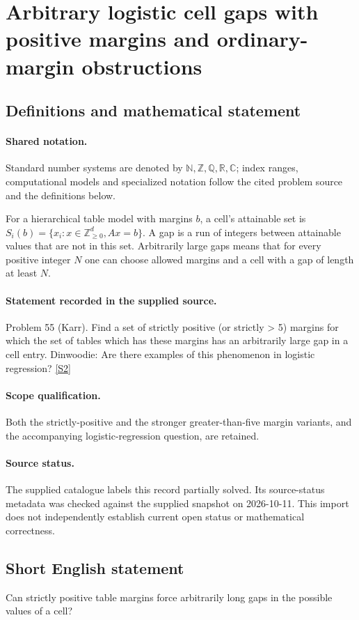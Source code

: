 \documentclass[11pt]{article}
\newcommand{\sref}[2]{\hyperlink{source:#1:#2}{[S#2]}}
\begin{document}
\section{Arbitrary logistic cell gaps with positive margins and ordinary-margin obstructions}\label{statement}

\subsection{Definitions and mathematical statement}

\paragraph{Shared notation.}Standard number systems are denoted by $\mathbb N,\mathbb Z,\mathbb Q,\mathbb R,\mathbb C$; index ranges, computational models and specialized notation follow the cited problem source and the definitions below.


For a hierarchical table model with margins $b$, a cell's attainable set is $S_i(b)=\{x_i:x\in\mathbb Z_{\ge0}^d,Ax=b\}$. A gap is a run of integers between attainable values that are not in this set. Arbitrarily large gaps means that for every positive integer $N$ one can choose allowed margins and a cell with a gap of length at least $N$.
\paragraph{Statement recorded in the supplied source.}
Problem 55 (Karr). Find a set of strictly positive (or strictly > 5) margins for which the set of tables which has these margins has an arbitrarily large gap in a cell entry. Dinwoodie: Are there examples of this phenomenon in logistic regression? \sref{statement}{2}
\paragraph{Scope qualification.}
Both the strictly-positive and the stronger greater-than-five margin variants, and the accompanying logistic-regression question, are retained.
\paragraph{Source status.}
The supplied catalogue labels this record partially solved. Its source-status metadata was checked against the supplied snapshot on 2026-10-11. This import does not independently establish current open status or mathematical correctness.
\subsection{Short English statement}
Can strictly positive table margins force arbitrarily long gaps in the possible values of a cell?
\end{document}
